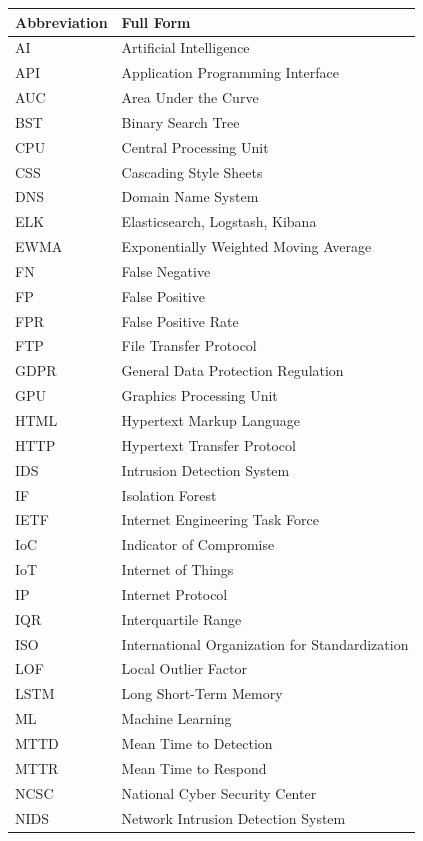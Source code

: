 \documentclass[
  a4paper]{report}
\newcounter{none} %
\begin{document}
{\def\LTcaptype{none} %
\begin{longtable}[]{@{}ll@{}}
\toprule\noalign{}
Abbreviation & Full Form \\
\midrule\noalign{}
\endhead
\bottomrule\noalign{}
\endlastfoot
AI & Artificial Intelligence \\
API & Application Programming Interface \\
AUC & Area Under the Curve \\
BST & Binary Search Tree \\
CPU & Central Processing Unit \\
CSS & Cascading Style Sheets \\
DNS & Domain Name System \\
ELK & Elasticsearch, Logstash, Kibana \\
EWMA & Exponentially Weighted Moving Average \\
FN & False Negative \\
FP & False Positive \\
FPR & False Positive Rate \\
FTP & File Transfer Protocol \\
GDPR & General Data Protection Regulation \\
GPU & Graphics Processing Unit \\
HTML & Hypertext Markup Language \\
HTTP & Hypertext Transfer Protocol \\
IDS & Intrusion Detection System \\
IF & Isolation Forest \\
IETF & Internet Engineering Task Force \\
IoC & Indicator of Compromise \\
IoT & Internet of Things \\
IP & Internet Protocol \\
IQR & Interquartile Range \\
ISO & International Organization for Standardization \\
LOF & Local Outlier Factor \\
LSTM & Long Short-Term Memory \\
ML & Machine Learning \\
MTTD & Mean Time to Detection \\
MTTR & Mean Time to Respond \\
NCSC & National Cyber Security Center \\
NIDS & Network Intrusion Detection System \\

\end{longtable}}
\end{document}
